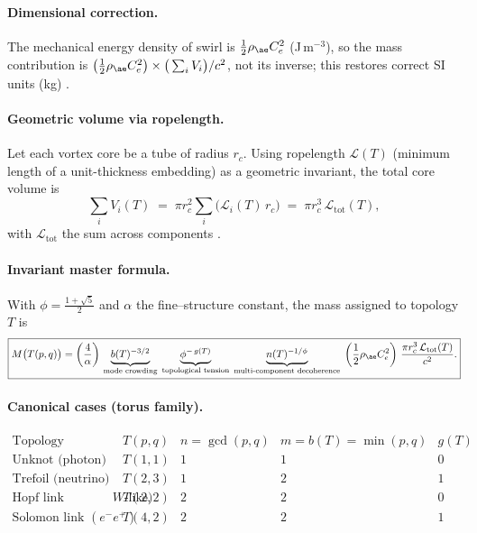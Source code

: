 \documentclass[11pt, a4paper]{article}
\begin{document}
\paragraph{Dimensional correction.}
The mechanical energy density of swirl is \( \tfrac12 \rho_{\ae} C_e^2 \) (J\,m\(^{-3}\)), so the mass contribution is
\(
\big(\tfrac12 \rho_{\ae} C_e^2\big)\times \big(\sum_i V_i\big)/c^2
\),
not its inverse; this restores correct SI units (kg) \cite{Batchelor1967Fluid}.

\paragraph{Geometric volume via ropelength.}
Let each vortex core be a tube of radius \(r_c\). Using ropelength \(\mathcal{L}(T)\) (minimum length of a unit-thickness embedding) as a geometric invariant, the total core volume is
\[
    \sum_{i} V_i(T) \;=\; \pi r_c^2 \sum_i \big(\mathcal{L}_i(T)\,r_c\big)
    \;=\; \pi r_c^3\,\mathcal{L}_{\mathrm{tot}}(T),
\]
with \(\mathcal{L}_{\mathrm{tot}}\) the sum across components \cite{CantarellaKusnerSullivan2002Ropelength,Rawdon2003Approximating}.

\paragraph{Invariant master formula.}
With \(\phi=\tfrac{1+\sqrt{5}}{2}\) and \(\alpha\) the fine–structure constant, the mass assigned to topology \(T\) is
\[
    \boxed{
        M\big(T(p,q)\big)
        =\left(\frac{4}{\alpha}\right)\,
        \underbrace{b(T)^{-3/2}}_{\text{mode crowding}}\;
        \underbrace{\phi^{-\,g(T)}}_{\text{topological tension}}\;
        \underbrace{n(T)^{-1/\phi}}_{\text{multi\mbox{-}component decoherence}}\;
        \left(\frac{1}{2}\rho_{\ae} C_e^2\right)\,
        \frac{\pi r_c^3\,\mathcal{L}_{\mathrm{tot}}(T)}{c^2}.
    }
\]

\paragraph{Canonical cases (torus family).}
\[
    \begin{array}{l|c|c|c|c}
        \text{Topology} & T(p,q) & n=\gcd(p,q) & m=b(T)=\min(p,q) & g(T) \\ \hline
        \text{Unknot (photon)} & T(1,1) & 1 & 1 & 0 \\
        \text{Trefoil (neutrino)} & T(2,3) & 1 & 2 & 1 \\
        \text{Hopf link (polariton/$W$-like)} & T(2,2) & 2 & 2 & 0 \\
        \text{Solomon link }(e^-e^+) & T(4,2) & 2 & 2 & 1 \\
    \end{array}
\]
\end{document}
